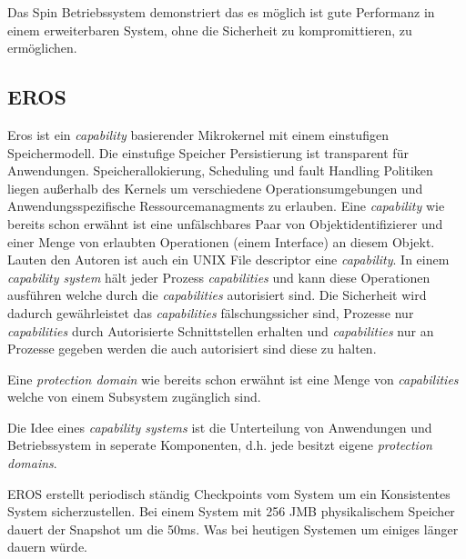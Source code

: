 \documentclass[9pt,technote]{IEEEtran}
\begin{document}
      Das Spin Betriebssystem demonstriert das es m\"oglich ist gute Performanz in einem erweiterbaren System, 
      ohne die Sicherheit zu kompromittieren, zu erm\"oglichen.
    \subsection{EROS}      
        Eros ist ein \textit{capability} basierender Mikrokernel mit einem einstufigen Speichermodell. 
        Die einstufige Speicher Persistierung ist transparent f\"ur Anwendungen.
        Speicherallokierung, Scheduling und fault Handling Politiken liegen au\ss erhalb des Kernels um 
        verschiedene Operationsumgebungen und Anwendungsspezifische Ressourcemanagments zu erlauben.
        Eine \textit{capability} wie bereits schon erw\"ahnt ist eine unf\"alschbares Paar von Objektidentifizierer 
        und einer Menge von erlaubten Operationen (einem Interface) an diesem Objekt.
        Lauten den Autoren ist auch ein UNIX File descriptor eine \textit{capability}. In einem \textit{capability system} 
        h\"alt jeder Prozess \textit{capabilities} und kann diese Operationen ausf\"uhren
        welche durch die \textit{capabilities} autorisiert sind. Die Sicherheit wird dadurch gew\"ahrleistet das \textit{capabilities} 
        f\"alschungssicher sind, Prozesse nur \textit{capabilities} durch
        Autorisierte Schnittstellen erhalten und \textit{capabilities} nur an Prozesse gegeben werden die auch autorisiert sind diese zu halten.
        
        Eine \textit{protection domain} wie bereits schon erw\"ahnt ist eine Menge von \textit{capabilities} welche von einem Subsystem zug\"anglich sind.
        
        Die Idee eines \textit{capability systems} ist die Unterteilung von Anwendungen und Betriebssystem in seperate Komponenten,
        d.h. jede besitzt eigene \textit{protection domains}.
        
        EROS erstellt periodisch st\"andig Checkpoints vom System um ein Konsistentes System sicherzustellen. 
        Bei einem System mit 256 JMB physikalischem Speicher dauert der Snapshot um die
        50ms. Was bei heutigen Systemen um einiges l\"anger dauern w\"urde.
\end{document}
